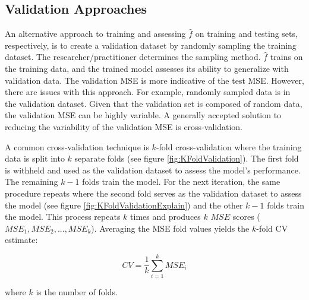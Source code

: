 \subsection{Validation Approaches} \label{sec:validationApproach}

An alternative approach to training and assessing \(\hat{f}\) on training and testing sets, respectively, is to create a validation dataset by randomly sampling the training dataset.  The researcher/practitioner determines the sampling method.  \(\hat{f}\) trains on the training data, and the trained model assesses its ability to generalize with validation data. The validation MSE is more indicative of the test MSE. However, there are issues with this approach. For example, randomly sampled data is in the validation dataset.  Given that the validation set is composed of random data, the validation MSE can be highly variable. A generally accepted solution to reducing the variability of the validation MSE is cross-validation.

A common cross-validation technique is \(k\)-fold cross-validation where the training data is split into \(k\) separate folds (see figure \ref{fig:KFoldValidation}). The first fold is withheld and used as the validation dataset to assess the model's performance. The remaining \(k-1\) folds train the model. For the next iteration, the same procedure repeats where the second fold serves as the validation dataset to assess the model (see figure \ref{fig:KFoldValidationExplain}) and the other \(k-1\) folds train the model. This process repeats \(k\) times and  produces \(k\) \(MSE\) scores (\(MSE_1, MSE_2, ... , MSE_k\)). Averaging the MSE fold values yields the \(k\)-fold CV estimate:

\begin{equation}
\label{eq:CV}
CV = \frac{1}{k} \sum_{i=1}^k MSE_i
\end{equation}

\noindent where \(k\) is the number of folds. 

